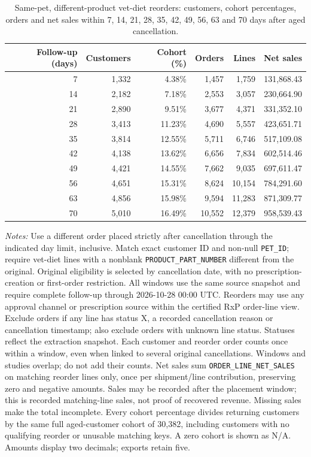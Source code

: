 \begin{table}[!htbp]
\centering
\caption{Same-pet, different-product vet-diet reorders: customers, cohort percentages, orders and net sales within 7, 14, 21, 28, 35, 42, 49, 56, 63 and 70 days after aged cancellation.}
\label{tab:financial-opportunity-reorder-same-pet-different-part}
\begin{tabular}{@{}rrrrrr@{}}
\toprule
Follow-up (days) & Customers & Cohort (\%) & Orders & Lines & Net sales \\
\midrule
7 & 1,332 & 4.38\% & 1,457 & 1,759 & 131,868.43 \\
14 & 2,182 & 7.18\% & 2,553 & 3,057 & 230,664.90 \\
21 & 2,890 & 9.51\% & 3,677 & 4,371 & 331,352.10 \\
28 & 3,413 & 11.23\% & 4,690 & 5,557 & 423,651.71 \\
35 & 3,814 & 12.55\% & 5,711 & 6,746 & 517,109.08 \\
42 & 4,138 & 13.62\% & 6,656 & 7,834 & 602,514.46 \\
49 & 4,421 & 14.55\% & 7,662 & 9,035 & 697,611.47 \\
56 & 4,651 & 15.31\% & 8,624 & 10,154 & 784,291.60 \\
63 & 4,856 & 15.98\% & 9,594 & 11,283 & 871,309.77 \\
70 & 5,010 & 16.49\% & 10,552 & 12,379 & 958,539.43 \\
\bottomrule
\end{tabular}

\begin{minipage}{\linewidth}
\footnotesize
\textit{Notes:} Use a different order placed strictly after cancellation through the indicated day limit, inclusive. Match exact customer ID and non-null \texttt{PET\_ID}; require vet-diet lines with a nonblank \texttt{PRODUCT\_PART\_NUMBER} different from the original. Original eligibility is selected by
cancellation date, with no prescription-creation or first-order restriction.
All windows use the same source snapshot and require complete follow-up through
2026-10-28 00:00 UTC. Reorders may use any approval channel or prescription
source within the certified RxP order-line view. Exclude orders if any line has
status X, a recorded cancellation reason or cancellation timestamp; also exclude
orders with unknown line status. Statuses reflect the extraction snapshot.
Each customer and reorder order counts once within a window, even when linked
to several original cancellations. Windows and studies overlap; do not add their counts.
Net sales sum \texttt{ORDER\_LINE\_NET\_SALES} on matching reorder lines only,
once per shipment/line contribution, preserving zero and negative amounts.
Sales may be recorded after the placement window; this is recorded matching-line
sales, not proof of recovered revenue. Missing sales make the total incomplete.
Every cohort percentage divides returning customers by the same full aged-customer cohort of 30,382, including customers with no qualifying reorder or unusable matching keys. A zero cohort is shown as N/A. Amounts display two decimals; exports retain five.
\end{minipage}
\end{table}

